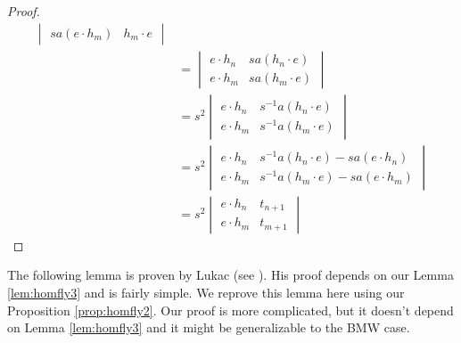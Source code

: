 \begin{proof}
\begin{align*}
\begin{vmatrix}
s a ( e \cdot h_{m} ) & h_m \cdot e
\end{vmatrix} \\
& = 
\begin{vmatrix}
e \cdot h_{n} & s a ( h_n \cdot e ) \\
e \cdot h_{m} & s a ( h_m \cdot e )
\end{vmatrix} \\
& = s^2 
\begin{vmatrix}
e \cdot h_{n} & s^{-1} a ( h_n \cdot e ) \\
e \cdot h_{m} & s^{-1} a ( h_m \cdot e )
\end{vmatrix} \\
& = s^2 
\begin{vmatrix}
e \cdot h_{n} & s^{-1} a ( h_n \cdot e ) - s a ( e \cdot h_n )\\
e \cdot h_{m} & s^{-1} a ( h_m \cdot e ) - s a ( e \cdot h_m )
\end{vmatrix} \\
& = s^2 
\begin{vmatrix}
e \cdot h_{n} & t_{n+1} \\
e \cdot h_{m} & t_{m+1}
\end{vmatrix}
\end{align*}
\end{proof}


The following lemma is proven by Lukac (see \cite[Lemma 9.1]{Luk05}). His proof depends on our Lemma \ref{lem:homfly3} and is fairly simple. We reprove this lemma here using our Proposition \ref{prop:homfly2}. Our proof is more complicated, but it doesn't depend on Lemma \ref{lem:homfly3} and it might be generalizable to the BMW case. 

